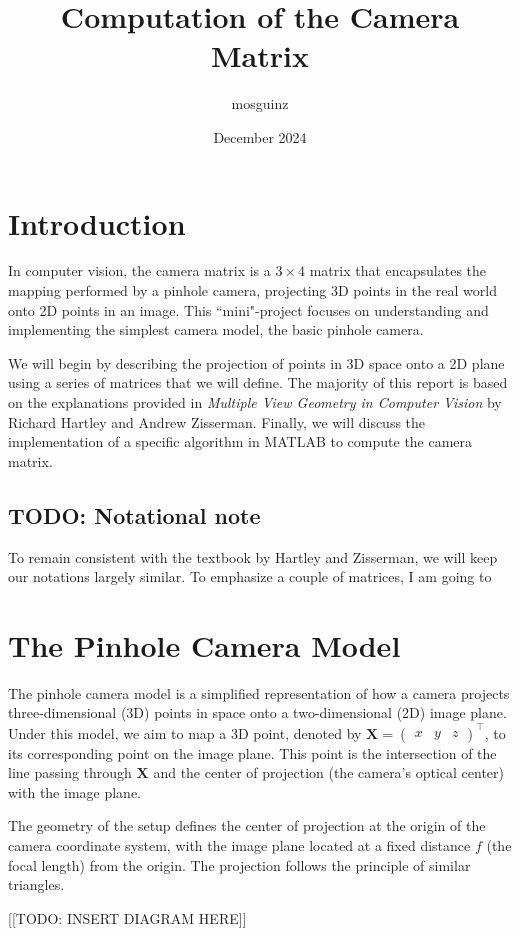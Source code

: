 \documentclass[12pt]{article}
\title{Computation of the Camera Matrix}
\author{mosguinz}
\date{December 2024}
\begin{document}
\section{Introduction}

In computer vision, the camera matrix is a $3 \times 4$ matrix that encapsulates the mapping performed by a pinhole camera, projecting 3D points in the real world onto 2D points in an image. This ``mini"-project focuses on understanding and implementing the simplest camera model, the basic pinhole camera.

We will begin by describing the projection of points in 3D space onto a 2D plane using a series of matrices that we will define. The majority of this report is based on the explanations provided in \textit{Multiple View Geometry in Computer Vision} by Richard Hartley and Andrew Zisserman. Finally, we will discuss the implementation of a specific algorithm in MATLAB to compute the camera matrix.

\subsection{TODO: Notational note}

To remain consistent with the textbook by Hartley and Zisserman, we will keep our notations largely similar. To emphasize a couple of matrices, I am going to 

\section{The Pinhole Camera Model}

The pinhole camera model is a simplified representation of how a camera projects three-dimensional (3D) points in space onto a two-dimensional (2D) image plane. Under this model, we aim to map a 3D point, denoted by 
$\mathbf{X} = \begin{pmatrix} x & y & z \end{pmatrix}^\top$, 
to its corresponding point on the image plane. This point is the intersection of the line passing through $\mathbf{X}$ and the center of projection (the camera's optical center) with the image plane.

The geometry of the setup defines the center of projection at the origin of the camera coordinate system, with the image plane located at a fixed distance $f$ (the focal length) from the origin. The projection follows the principle of similar triangles.

[[TODO: INSERT DIAGRAM HERE]]
\end{document}
